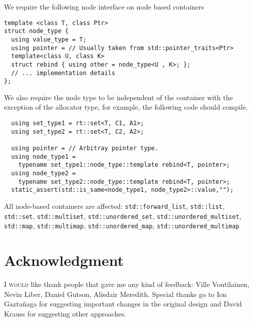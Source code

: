 \documentclass[11pt]{article}
\begin{document}
We require the following node interface on node based containers

\begin{lstlisting}
template <class T, class Ptr>
struct node_type {
  using value_type = T;
  using pointer = // Usually taken from std::pointer_traits<Ptr>
  template<class U, class K>
  struct rebind { using other = node_type<U , K>; };
  // ... implementation details
};
\end{lstlisting}

We also require the node type to be independent of the container
with the exception of the allocator type, for example, the following code should compile.

\newpage
\begin{lstlisting}
  using set_type1 = rt::set<T, C1, A1>;
  using set_type2 = rt::set<T, C2, A2>;

  using pointer = // Arbitray pointer type.
  using node_type1 =
    typename set_type1::node_type::template rebind<T, pointer>;
  using node_type2 = 
    typename set_type2::node_type::template rebind<T, pointer>;
  static_assert(std::is_same<node_type1, node_type2>::value,"");
\end{lstlisting}

All node-based containers are affected: \texttt{std::forward\_list},
\texttt{std::list}, \texttt{std::set}, \texttt{std::multiset},
\texttt{std::unordered\_set}, \texttt{std::unordered\_multiset},
\texttt{std::map}, \texttt{std::multimap},
\texttt{std::unordered\_map}, \texttt{std::unordered\_multimap}

\section{Acknowledgment}

\textsc{I would} like thank people that gave me any kind of feedback: Ville Voutilainen,
Nevin Liber, Daniel Gutson, Alisdair Meredith. Special thanks go
to Ion Gaztañaga for suggesting important changes in the original design and
David Krauss for suggesting other approaches.
\end{document}
